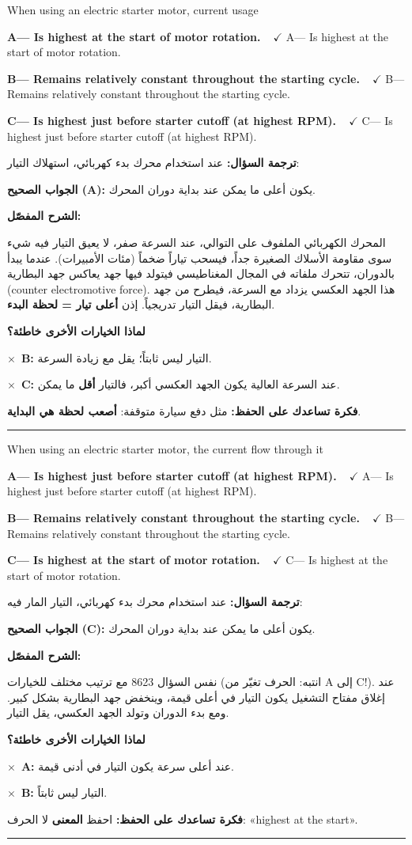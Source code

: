\documentclass[11pt,a4paper]{article}
\newcommand{\en}[1]{\textenglish{#1}}
\newcommand{\correctletter}{}
\newcommand{\opt}[2]{%
  \ifdefstring{\correctletter}{#1}%
    {\textcolor{ansgreen}{\textbf{#1— #2\ \ $\checkmark$}}}%
    {#1— #2}\par}
\newcommand{\Q}[6]{%
  \renewcommand{\correctletter}{#6}%
  \par\bigskip
  \phantomsection\label{q#1}%
  \begin{tcolorbox}[enhanced,breakable,colback=qback,colframe=qframe,
      arc=2mm,boxrule=0.8pt,fonttitle=\bfseries,
      title={\en{Question #1}}]
    \begin{english}
      #2\par\smallskip
      \opt{A}{#3}\opt{B}{#4}\opt{C}{#5}
    \end{english}
  \end{tcolorbox}}
\newcommand{\tr}[1]{\textbf{\textcolor{qframe}{ترجمة السؤال:}} #1\par}
\newcommand{\ans}[2]{%
  \begin{tcolorbox}[colback=ansback,colframe=ansgreen,boxrule=0.6pt,arc=1.5mm,
      left=4pt,right=4pt,top=2pt,bottom=2pt]
    \textbf{\textcolor{ansgreen}{الجواب الصحيح (\en{#1}):}} #2
  \end{tcolorbox}}
\newcommand{\sharh}[1]{\textbf{\textcolor{conceptc}{الشرح المفصّل:}}\par #1\par}
\newcommand{\nohead}{\textbf{\textcolor{wrongc}{لماذا الخيارات الأخرى خاطئة؟}}\par}
\newcommand{\no}[2]{\hspace*{1em}\textcolor{wrongc}{$\times$}\ \textbf{\en{#1}:} #2\par}
\newcommand{\tip}[1]{%
  \begin{tcolorbox}[colback=tipback,colframe=tipframe,boxrule=0.5pt,arc=1.5mm,
      left=4pt,right=4pt,top=2pt,bottom=2pt]
    \textbf{فكرة تساعدك على الحفظ:} #1
  \end{tcolorbox}}
\newcommand{\qsep}{\par\medskip\noindent\textcolor{qframe!40}{\rule{\linewidth}{0.4pt}}\par}
\begin{document}
\Q{8623}{When using an electric starter motor, current usage}
{Is highest at the start of motor rotation.}
{Remains relatively constant throughout the starting cycle.}
{Is highest just before starter cutoff (at highest RPM).}{A}
\tr{عند استخدام محرك بدء كهربائي، استهلاك التيار:}
\ans{A}{يكون أعلى ما يمكن عند بداية دوران المحرك.}
\sharh{المحرك الكهربائي الملفوف على التوالي، عند السرعة صفر، لا يعيق التيار فيه شيء سوى مقاومة الأسلاك الصغيرة جداً، فيسحب تياراً ضخماً (مئات الأمبيرات). عندما يبدأ بالدوران، تتحرك ملفاته في المجال المغناطيسي فيتولد فيها جهد يعاكس جهد البطارية (\en{counter electromotive force}). هذا الجهد العكسي يزداد مع السرعة، فيطرح من جهد البطارية، فيقل التيار تدريجياً. إذن \textbf{أعلى تيار = لحظة البدء}.}
\nohead
\no{B}{التيار ليس ثابتاً؛ يقل مع زيادة السرعة.}
\no{C}{عند السرعة العالية يكون الجهد العكسي أكبر، فالتيار \textbf{أقل} ما يمكن.}
\tip{مثل دفع سيارة متوقفة: \textbf{أصعب لحظة هي البداية}.}
\qsep

\Q{8624}{When using an electric starter motor, the current flow through it}
{Is highest just before starter cutoff (at highest RPM).}
{Remains relatively constant throughout the starting cycle.}
{Is highest at the start of motor rotation.}{C}
\tr{عند استخدام محرك بدء كهربائي، التيار المار فيه:}
\ans{C}{يكون أعلى ما يمكن عند بداية دوران المحرك.}
\sharh{نفس السؤال 8623 مع ترتيب مختلف للخيارات (انتبه: الحرف تغيّر من A إلى C!). عند إغلاق مفتاح التشغيل يكون التيار في أعلى قيمة، وينخفض جهد البطارية بشكل كبير. ومع بدء الدوران وتولد الجهد العكسي، يقل التيار.}
\nohead
\no{A}{عند أعلى سرعة يكون التيار في أدنى قيمة.}
\no{B}{التيار ليس ثابتاً.}
\tip{احفظ \textbf{المعنى} لا الحرف: «\en{highest at the start}».}
\qsep
\end{document}
